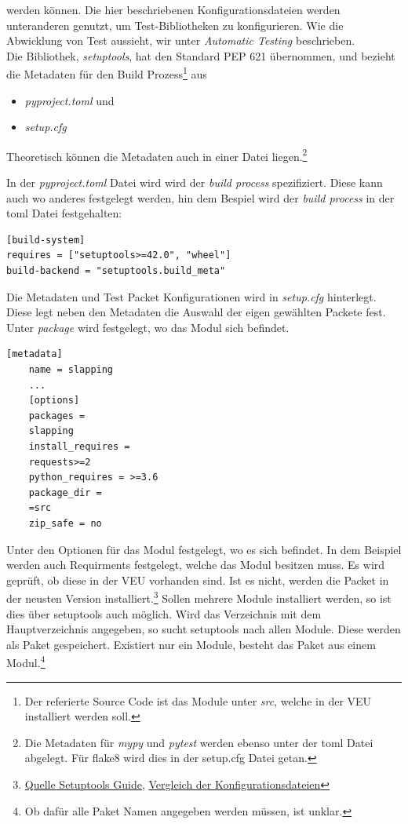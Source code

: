 werden können. Die hier beschriebenen Konfigurationsdateien werden unteranderen genutzt, um Test-Bibliotheken zu konfigurieren. Wie die Abwicklung von Test aussieht, wir unter \textit{Automatic Testing} beschrieben.\\

Die Bibliothek, \textit{setuptools}, hat den Standard PEP 621 übernommen, und bezieht die Metadaten für den Build Prozess\footnote{
	Der referierte Source Code ist das Module unter \textit{src}, welche in der \gls{VEU} installiert werden soll. 
} 
aus
\begin{itemize}
	\item \textit{pyproject.toml} und
	\item \textit{setup.cfg}
\end{itemize}
Theoretisch können die Metadaten auch in einer Datei liegen.\footnote{
Die Metadaten für \textit{mypy} und \textit{pytest} werden ebenso unter der toml Datei abgelegt. Für flake8 wird dies in der setup.cfg Datei getan.
}


In der \textit{pyproject.toml} Datei wird wird der \textit{build process} spezifiziert. Diese kann auch wo anderes festgelegt werden, hin dem Bespiel wird der \textit{build process} in der toml Datei festgehalten:
\begin{lstlisting}[style=Config]
[build-system]
requires = ["setuptools>=42.0", "wheel"]
build-backend = "setuptools.build_meta"
\end{lstlisting}

Die Metadaten und Test Packet Konfigurationen wird in \textit{setup.cfg} hinterlegt.
Diese legt neben den Metadaten die Auswahl der eigen gewählten Packete fest. Unter \textit{package} wird festgelegt, wo das Modul sich befindet.

\begin{lstlisting}[style=Config, caption={Beispiel Slapping Modul}, captionpos=b]
	[metadata]
	name = slapping
	...
	[options]
	packages =
	slapping
	install_requires =
	requests>=2
	python_requires = >=3.6
	package_dir =
	=src
	zip_safe = no
\end{lstlisting}

Unter den Optionen für das Modul festgelegt, wo es sich befindet. In dem Beispiel werden auch Requirments festgelegt, welche das Modul besitzen muss. Es wird geprüft, ob diese in der \gls{VEU} vorhanden sind. Ist es nicht, werden die Packet in der neusten Version installiert.\footnote{
	\href{https://setuptools.pypa.io/en/latest/userguide/declarative_config.html}{Quelle Setuptools Guide},
	\href{https://ianhopkinson.org.uk/2022/02/understanding-setup-py-setup-cfg-and-pyproject-toml-in-python/}{Vergleich der Konfigurationsdateien}
}
Sollen mehrere Module installiert werden, so ist dies über setuptools auch möglich. Wird das Verzeichnis mit dem Hauptverzeichnis angegeben, so sucht setuptools nach allen Module. Diese werden als Paket gespeichert. Existiert nur ein Module, besteht das Paket aus einem Modul.\footnote{
	Ob dafür alle Paket Namen angegeben werden müssen, ist unklar.
}


